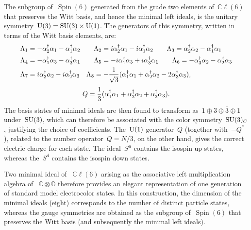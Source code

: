 \documentclass[reqno,11pt]{amsart}
\numberwithin{equation}{section}
\newcommand{\1}{\mbox{\rm 1 \hspace{-1.05 em} 1}}
\newcommand{\U}{{\rm{U}}}
\newcommand{\SU}{{\rm{SU}}}
\DeclareMathOperator{\Spin}{Spin}
\newcommand{\bb}[1]{\mathbb{#1}}
\begin{document}
The subgroup of~$\Spin(6)$ generated from the grade two elements of~$\bb{C}\ell(6)$ that preserves the Witt basis, and hence the minimal left ideals, is the unitary symmetry~$\U(3)=\SU(3)\times \U(1)$. The generators of this symmetry, written in terms of the Witt basis elements, are:
    \begin{align} \notag
     \Lambda_1 &= -\alpha_2^\dagger\alpha_1 - \alpha_1^\dagger\alpha_2 \notag \hspace{2em}
     \Lambda_2 = i\alpha_2^\dagger\alpha_1 -i\alpha_1^\dagger\alpha_2 \notag \hspace{2em}
     \Lambda_3 = \alpha_2^\dagger\alpha_2 - \alpha_1^\dagger\alpha_1 \notag\\ 
     \Lambda_4 &= -\alpha_1^\dagger\alpha_3 - \alpha_3^\dagger\alpha_1 \notag \hspace{2em}
     \Lambda_5 = -i\alpha_1^\dagger\alpha_3 + i\alpha_3^\dagger\alpha_1 \notag \hspace{2em}
     \Lambda_6 = -\alpha_3^\dagger\alpha_2 - \alpha_2^\dagger\alpha_3 \notag\\
     \Lambda_7 &= i\alpha_3^\dagger\alpha_2 - i\alpha_2^\dagger\alpha_3 \notag \hspace{1em}
     \Lambda_8 = -\frac{1}{\sqrt{3}}(\alpha_1^\dagger\alpha_1 + \alpha_2^\dagger\alpha_2 - 2\alpha_3^\dagger\alpha_3), \notag
 \end{align}
     \begin{equation} \notag
     Q = \frac{1}{3}(\alpha_1^\dagger\alpha_1 + \alpha_2^\dagger\alpha_2 + \alpha_3^\dagger\alpha_3).
 \end{equation}
The basis states of minimal ideals are then found to transform as~$1\oplus 3\oplus\overline{3}\oplus1$ under~$\SU(3)$, which can therefore be associated with the color symmetry~$\SU(3)_C$, justifying the choice of coefficients. The~$\U(1)$ generator~$Q$ (together with~$-Q^*$), related to the number operator~$Q=N/3$, on the other hand, gives the correct electric charge for each state. The ideal~$S^u$ contains the isospin up states, whereas the~$S^d$ contains the isospin down states.

Two minimal ideal of ~$\bb{C}\ell(6)$ arising as the associative left multiplication algebra of ~$\bb{C}\otimes\bb{O}$ therefore provides an elegant representation of one generation of standard model electrocolor states. In this construction, the dimension of the minimal ideals (eight) corresponds to the number of distinct particle states, whereas the gauge symmetries are obtained as the subgroup of~$\Spin(6)$ that preserves the Witt basis (and subsequently the minimal left ideals).
\end{document}
